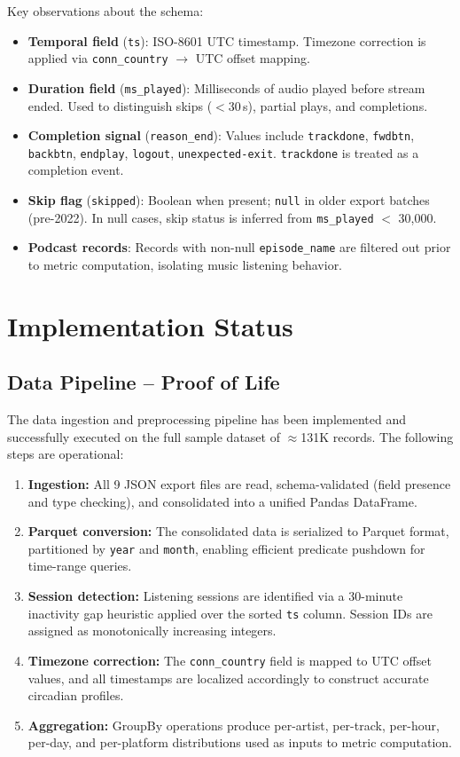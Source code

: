 \documentclass[conference]{IEEEtran}
\begin{document}
\noindent Key observations about the schema:
\begin{itemize}
    \item \textbf{Temporal field} (\texttt{ts}): ISO-8601 UTC timestamp. Timezone correction is applied via \texttt{conn\_country} $\rightarrow$ UTC offset mapping.
    \item \textbf{Duration field} (\texttt{ms\_played}): Milliseconds of audio played before stream ended. Used to distinguish skips ($<$30\,s), partial plays, and completions.
    \item \textbf{Completion signal} (\texttt{reason\_end}): Values include \texttt{trackdone}, \texttt{fwdbtn}, \texttt{backbtn}, \texttt{endplay}, \texttt{logout}, \texttt{unexpected-exit}. \texttt{trackdone} is treated as a completion event.
    \item \textbf{Skip flag} (\texttt{skipped}): Boolean when present; \texttt{null} in older export batches (pre-2022). In null cases, skip status is inferred from \texttt{ms\_played} $<$ 30{,}000.
    \item \textbf{Podcast records}: Records with non-null \texttt{episode\_name} are filtered out prior to metric computation, isolating music listening behavior.
\end{itemize}

\section{Implementation Status}

\subsection{Data Pipeline -- Proof of Life}

The data ingestion and preprocessing pipeline has been implemented and successfully executed on the full sample dataset of $\approx$131K records. The following steps are operational:

\begin{enumerate}
    \item \textbf{Ingestion:} All 9 JSON export files are read, schema-validated (field presence and type checking), and consolidated into a unified Pandas DataFrame.
    \item \textbf{Parquet conversion:} The consolidated data is serialized to Parquet format, partitioned by \texttt{year} and \texttt{month}, enabling efficient predicate pushdown for time-range queries.
    \item \textbf{Session detection:} Listening sessions are identified via a 30-minute inactivity gap heuristic applied over the sorted \texttt{ts} column. Session IDs are assigned as monotonically increasing integers.
    \item \textbf{Timezone correction:} The \texttt{conn\_country} field is mapped to UTC offset values, and all timestamps are localized accordingly to construct accurate circadian profiles.
    \item \textbf{Aggregation:} GroupBy operations produce per-artist, per-track, per-hour, per-day, and per-platform distributions used as inputs to metric computation.
\end{enumerate}
\end{document}
